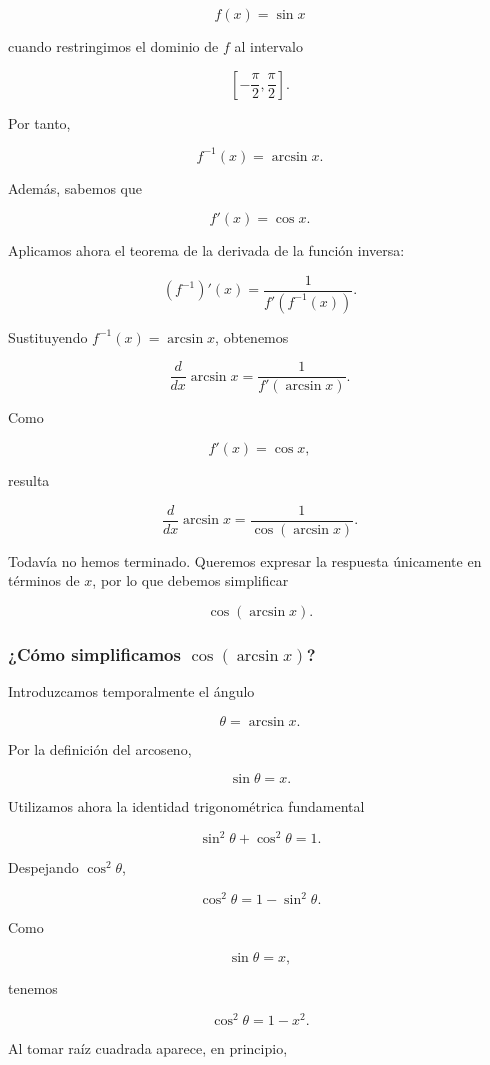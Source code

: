 \documentclass[12pt]{article}
\theoremstyle{definition}
\theoremstyle{remark}
\begin{document}
\[
f(x)=\sin x
\]

cuando restringimos el dominio de $f$ al intervalo

\[
\left[-\frac{\pi}{2},\frac{\pi}{2}\right].
\]

Por tanto,

\[
f^{-1}(x)=\arcsin x.
\]

Además, sabemos que

\[
f'(x)=\cos x.
\]

Aplicamos ahora el teorema de la derivada de la función inversa:

\[
(f^{-1})'(x)
=
\frac{1}{f'(f^{-1}(x))}.
\]

Sustituyendo $f^{-1}(x)=\arcsin x$, obtenemos

\[
\frac{d}{dx}\arcsin x
=
\frac{1}{f'(\arcsin x)}.
\]

Como

\[
f'(x)=\cos x,
\]

resulta

\[
\boxed{
\frac{d}{dx}\arcsin x
=
\frac{1}{\cos(\arcsin x)}.
}
\]

Todavía no hemos terminado. Queremos expresar la respuesta únicamente
en términos de $x$, por lo que debemos simplificar

\[
\cos(\arcsin x).
\]

\subsubsection{¿Cómo simplificamos $\cos(\arcsin x)$?}

Introduzcamos temporalmente el ángulo

\[
\theta=\arcsin x.
\]

Por la definición del arcoseno,

\[
\sin\theta=x.
\]

Utilizamos ahora la identidad trigonométrica fundamental

\[
\sin^2\theta+\cos^2\theta=1.
\]

Despejando $\cos^2\theta$,

\[
\cos^2\theta
=
1-\sin^2\theta.
\]

Como

\[
\sin\theta=x,
\]

tenemos

\[
\cos^2\theta
=
1-x^2.
\]

Al tomar raíz cuadrada aparece, en principio,
\end{document}
